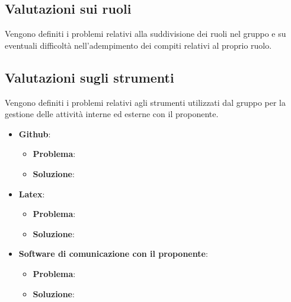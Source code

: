 \documentclass[../piano-di-qualifica.tex]{subfiles}
\begin{document}
\subsection{Valutazioni sui ruoli}
\label{sub:valutazioni_ruoli}
Vengono definiti i problemi relativi alla suddivisione dei ruoli nel gruppo e su eventuali difficoltà nell'adempimento dei compiti relativi al proprio ruolo.

\subsection{Valutazioni sugli strumenti}
\label{sub:valutazioni_strumenti}
Vengono definiti i problemi relativi agli strumenti utilizzati dal gruppo per la gestione delle attività interne ed esterne con il proponente.

\begin{itemize}
    \item \textbf{Github}:
    \begin{itemize}
        \item \textbf{Problema}:
        \item \textbf{Soluzione}:
    \end{itemize}
    \item \textbf{Latex}:
    \begin{itemize}
        \item \textbf{Problema}:
        \item \textbf{Soluzione}:
    \end{itemize}
    \item \textbf{Software di comunicazione con il proponente}:
    \begin{itemize}
        \item \textbf{Problema}:
        \item \textbf{Soluzione}:
    \end{itemize}
\end{itemize}
\end{document}
